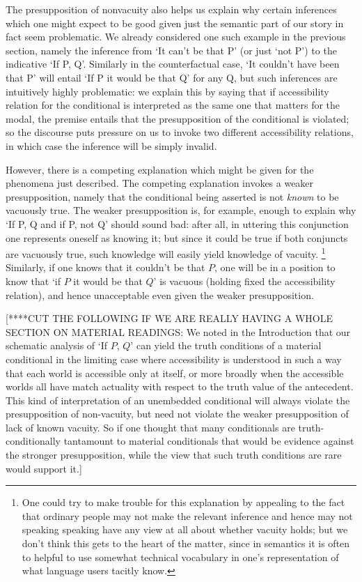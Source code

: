 \documentclass[If.tex]{subfiles}
\begin{document}
The presupposition of nonvacuity also helps us explain why certain inferences which one might expect to be good given just the semantic part of our story in fact seem problematic. We already considered one such example in the previous section, namely the inference from ‘It can't be that P’ (or just ‘not P’) to the indicative ‘If P, Q’. Similarly in the counterfactual case, ‘It couldn't have been that P’ will entail ‘If P it would be that Q’ for any Q, but such inferences are intuitively highly problematic: we explain this by saying that if accessibility relation for the conditional is interpreted as the same one that matters for the modal, the premise entails that the presupposition of the conditional is violated; so the discourse puts pressure on us to invoke two different accessibility relations, in which case the inference will be simply invalid.

However, there is a competing explanation which might be given for the phenomena just described. The competing explanation invokes a weaker presupposition, namely that the conditional being asserted is not \emph{known} to be vacuously true. The weaker presupposition is, for example, enough to explain why ‘If P, Q and if P, not Q’ should sound bad: after all, in uttering this conjunction one represents oneself as knowing it; but since it could be true if both conjuncts are vacuously true, such knowledge will easily yield knowledge of vacuity.%
\footnote{One could try to make trouble for this explanation by appealing to the fact that ordinary people may not make the relevant inference and hence may not speaking speaking have any view at all about whether vacuity holds; but we don't think this gets to the heart of the matter, since in semantics it is often to helpful to use somewhat technical vocabulary in one's representation of what language users tacitly know.}
 Similarly, if one knows that it couldn't be that $P$, one will be in a position to know that ‘if $P$ it would be that $Q$’ is vacuous (holding fixed the accessibility relation), and hence unacceptable even given the weaker presupposition.

[****CUT THE FOLLOWING IF WE ARE REALLY HAVING A WHOLE SECTION ON MATERIAL READINGS: 
We noted in the Introduction that our schematic analysis of ‘If $P$, $Q$’ can yield the truth conditions of a material conditional in the limiting case where accessibility is understood in such a way that each world is accessible only at itself, or more broadly when the accessible worlds all have match actuality with respect to the truth value of the antecedent. This kind of interpretation of an unembedded conditional will always violate the presupposition of non-vacuity, but need not violate the weaker presupposition of lack of known vacuity. So if one thought that many conditionals are truth-conditionally tantamount to material conditionals that would be evidence against the stronger presupposition, while the view that such truth conditions are rare would support it.]
\end{document}
